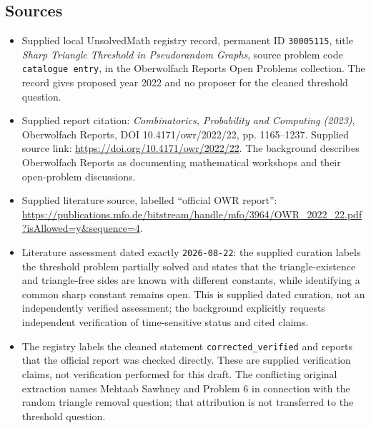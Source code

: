 \documentclass[11pt]{article}
\begin{document}
\subsection{Sources}
\begin{itemize}
\item Supplied local UnsolvedMath registry record, permanent ID \texttt{30005115}, title \emph{Sharp Triangle Threshold in Pseudorandom Graphs}, source problem code \texttt{catalogue entry}, in the Oberwolfach Reports Open Problems collection. The record gives proposed year 2022 and no proposer for the cleaned threshold question.
\item Supplied report citation: \emph{Combinatorics, Probability and Computing (2023)}, Oberwolfach Reports, DOI 10.4171/owr/2022/22, pp. 1165--1237. Supplied source link: \url{https://doi.org/10.4171/owr/2022/22}. The background describes Oberwolfach Reports as documenting mathematical workshops and their open-problem discussions.
\item Supplied literature source, labelled ``official OWR report'': \url{https://publications.mfo.de/bitstream/handle/mfo/3964/OWR_2022_22.pdf?isAllowed=y&sequence=4}.
\item Literature assessment dated exactly \texttt{2026-08-22}: the supplied curation labels the threshold problem partially solved and states that the triangle-existence and triangle-free sides are known with different constants, while identifying a common sharp constant remains open. This is supplied dated curation, not an independently verified assessment; the background explicitly requests independent verification of time-sensitive status and cited claims.
\item The registry labels the cleaned statement \texttt{corrected\_verified} and reports that the official report was checked directly. These are supplied verification claims, not verification performed for this draft. The conflicting original extraction names Mehtaab Sawhney and Problem 6 in connection with the random triangle removal question; that attribution is not transferred to the threshold question.
\end{itemize}
\end{document}
